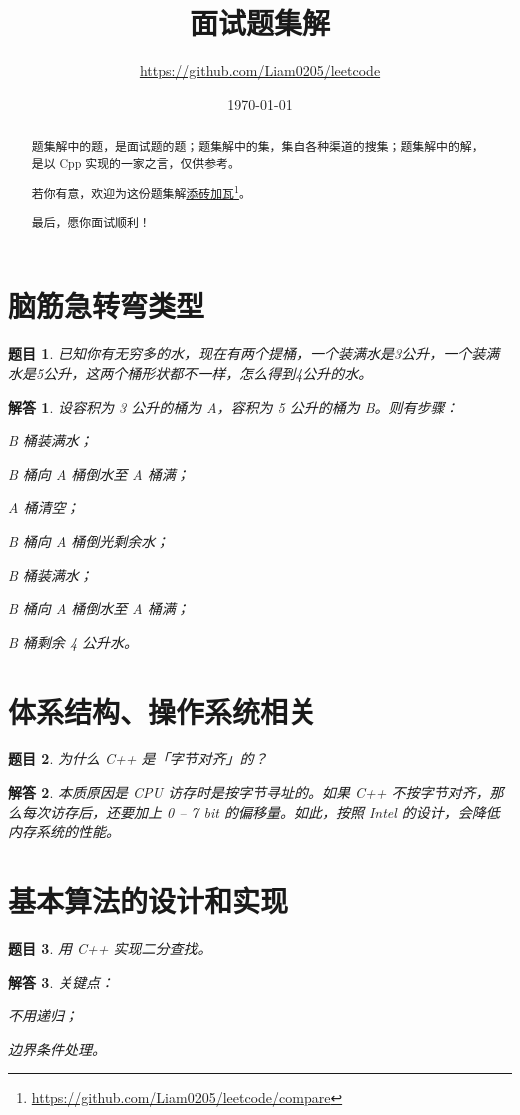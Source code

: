 \documentclass[UTF8, final]{ctexart}
\title{面试题集解}
\author{\url{https://github.com/Liam0205/leetcode}}
\date{\today}
\newtheorem{question}{题目}
\newtheorem{solution}{解答}
\begin{document}
\maketitle
\begin{abstract}
    题集解中的题，是面试题的题；题集解中的集，集自各种渠道的搜集；题集解中的解，是以 Cpp 实现的一家之言，仅供参考。

    若你有意，欢迎为这份题集解\href{https://github.com/Liam0205/leetcode/compare}{添砖加瓦}\footnote{\url{https://github.com/Liam0205/leetcode/compare}}。

    最后，愿你面试顺利！
\end{abstract}
\tableofcontents

\section{脑筋急转弯类型}
\begin{question}
已知你有无穷多的水，现在有两个提桶，一个装满水是3公升，一个装满水是5公升，这两个桶形状都不一样，怎么得到4公升的水。
\end{question}
\begin{solution}
设容积为 3 公升的桶为 A，容积为 5 公升的桶为 B。则有步骤：
\begin{compactitem}
    \item B 桶装满水；
    \item B 桶向 A 桶倒水至 A 桶满；
    \item A 桶清空；
    \item B 桶向 A 桶倒光剩余水；
    \item B 桶装满水；
    \item B 桶向 A 桶倒水至 A 桶满；
    \item B 桶剩余 4 公升水。
\end{compactitem}
\end{solution}

\section{体系结构、操作系统相关}
\begin{question}
为什么 C++ 是「字节对齐」的？
\end{question}
\begin{solution}
本质原因是 CPU 访存时是按字节寻址的。如果 C++ 不按字节对齐，那么每次访存后，还要加上 0 -- 7 bit 的偏移量。如此，按照 Intel 的设计，会降低内存系统的性能。
\end{solution}

\section{基本算法的设计和实现}
\begin{question}
用 C++ 实现二分查找。
\end{question}
\begin{solution}
关键点：
\begin{compactitem}
    \item 不用递归；
    \item 边界条件处理。
\end{compactitem}

\end{solution}
\end{document}

